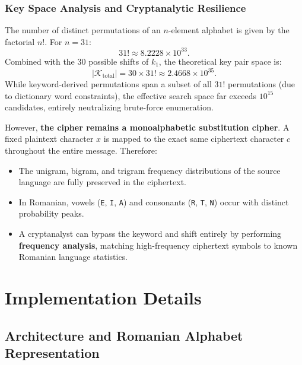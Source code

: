 \documentclass{labreport}
\begin{document}
\subsubsection{Key Space Analysis and Cryptanalytic Resilience}
The number of distinct permutations of an $n$-element alphabet is given by the factorial $n!$. For $n = 31$:
\begin{equation}
    31! \approx 8.2228 \times 10^{33}.
\end{equation}
Combined with the 30 possible shifts of $k_1$, the theoretical key pair space is:
\begin{equation}
    |\mathcal{K}_{\text{total}}| = 30 \times 31! \approx 2.4668 \times 10^{35}.
\end{equation}
While keyword-derived permutations span a subset of all $31!$ permutations (due to dictionary word constraints), the effective search space far exceeds $10^{15}$ candidates, entirely neutralizing brute-force enumeration.

However, \textbf{the cipher remains a monoalphabetic substitution cipher}. A fixed plaintext character $x$ is mapped to the exact same ciphertext character $c$ throughout the entire message. Therefore:
\begin{itemize}[noitemsep, topsep=2pt]
    \item The unigram, bigram, and trigram frequency distributions of the source language are fully preserved in the ciphertext.
    \item In Romanian, vowels (\texttt{E}, \texttt{I}, \texttt{A}) and consonants (\texttt{R}, \texttt{T}, \texttt{N}) occur with distinct probability peaks.
    \item A cryptanalyst can bypass the keyword and shift entirely by performing \textbf{frequency analysis}, matching high-frequency ciphertext symbols to known Romanian language statistics.
\end{itemize}

\section{Implementation Details}

\subsection{Architecture and Romanian Alphabet Representation}
\end{document}
